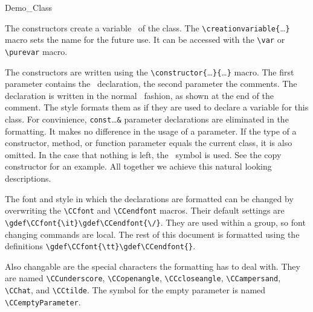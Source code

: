 \documentclass[12pt]{article}
\begin{document}
\begin{class}{Demo_Class}
{
\creation

The constructors create a variable \var\ of the class. The
\verb"\"\verb"creationvariable{"\ldots\verb"}" macro sets the name for the
future use. It can be accessed with the \verb"\"\verb"var" or
\verb"\"\verb"purevar" macro.

The constructors are written using the
\verb"\"\verb"constructor{"\ldots\verb"}{"\ldots\verb"}" macro. The first
parameter contains the \CC\ declaration, the second parameter the comments.
The declaration is written in the normal \CC\ fashion, as shown at the end
of the comment. The style formats them as if they are used
to declare a variable for this class. For convinience,
\verb"const"\ldots\verb"&" parameter declarations are eliminated in the
formatting. It makes no difference in the usage of a parameter. If the
type of a constructor, method, or function parameter equals the
current class, it is also omitted. In the case that nothing is left,
the \CCemptyParameter\ symbol is used. See the copy constructor for an
example. All together we achieve this natural looking descriptions.





The font and style in which the declarations are formatted can be
changed by overwriting the \verb"\CCfont" and \verb"\CCendfont"
macros. Their default settings are
\verb"\gdef\CCfont{\it}\gdef\CCendfont{\/}". They are used within a
group, so font changing commands are local. The rest of this document is
formatted using the definitions \verb"\gdef\CCfont{\tt}\gdef\CCendfont{}".

\gdef\CCfont{\tt}\gdef\CCendfont{}

\gdef\CCfont{\it}\gdef\CCendfont{\/}

Also changable are the special characters the formatting has to
deal with. They are named \verb"\CCunderscore", \verb"\CCopenangle",
\verb"\CCcloseangle", \verb"\CCampersand", \verb"\CChat", and
\verb"\CCtilde". The symbol for the empty parameter is named
\verb"\CCemptyParameter".

}
\end{class}
\end{document}

